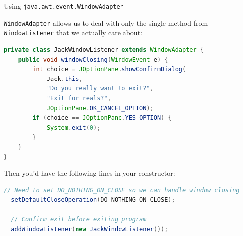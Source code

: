 \documentclass{beamer}
\begin{document}
\begin{frame}[fragile]{Using {\tt java.awt.event.WindowAdapter}}

\vspace{-.05in}
{\tt WindowAdapter} allows us to deal with only the single method from {\tt WindowListener} that we actually care about:
\vspace{-.05in}
\begin{lstlisting}[language=Java]
private class JackWindowListener extends WindowAdapter {
    public void windowClosing(WindowEvent e) {
        int choice = JOptionPane.showConfirmDialog(
            Jack.this,
            "Do you really want to exit?",
            "Exit for reals?",
            JOptionPane.OK_CANCEL_OPTION);
        if (choice == JOptionPane.YES_OPTION) {
            System.exit(0);
        }
    }
}
\end{lstlisting}
\vspace{-.05in}
Then you'd have the following lines in your constructor:
\vspace{-.05in}
\begin{lstlisting}[language=Java]
  // Need to set DO_NOTHING_ON_CLOSE so we can handle window closing
  setDefaultCloseOperation(DO_NOTHING_ON_CLOSE);
  
  // Confirm exit before exiting program
  addWindowListener(new JackWindowListener());
\end{lstlisting}

\end{frame}
\end{document}
